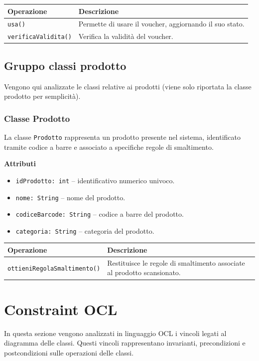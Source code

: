 \documentclass[12pt,a4paper]{article}
\begin{document}
\begin{table}[H]
\centering
\begin{tabularx}{\textwidth}{@{}lX@{}}
\toprule
\textbf{Operazione} & \textbf{Descrizione} \\ \midrule
\texttt{usa()} & Permette di usare il voucher, aggiornando il suo stato. \\
\texttt{verificaValidita()} & Verifica la validità del voucher. \\
\end{tabularx}
\end{table}

\subsection{Gruppo classi prodotto} 
Vengono qui analizzate le classi relative ai prodotti (viene solo riportata la classe prodotto per semplicità).

\subsubsection{Classe Prodotto}
La classe \texttt{Prodotto} rappresenta un prodotto presente nel sistema, 
identificato tramite codice a barre e associato a specifiche regole di smaltimento.

\textbf{Attributi}
\begin{itemize}
    \item \texttt{idProdotto: int} -- identificativo numerico univoco.
    \item \texttt{nome: String} -- nome del prodotto.
    \item \texttt{codiceBarcode: String} -- codice a barre del prodotto.
    \item \texttt{categoria: String} -- categoria del prodotto.
\end{itemize}

\begin{table}[H]
\centering
\begin{tabularx}{\textwidth}{@{}lX@{}}
\toprule
\textbf{Operazione} & \textbf{Descrizione} \\ \midrule
\texttt{ottieniRegolaSmaltimento()} & Restituisce le regole di smaltimento associate al prodotto scansionato. \\
\end{tabularx}
\end{table}

\newpage
\section{Constraint OCL} 
In questa sezione vengono analizzati in linguaggio OCL i vincoli legati al diagramma delle classi. Questi vincoli rappresentano invarianti, precondizioni e postcondizioni sulle operazioni delle classi.
\end{document}
